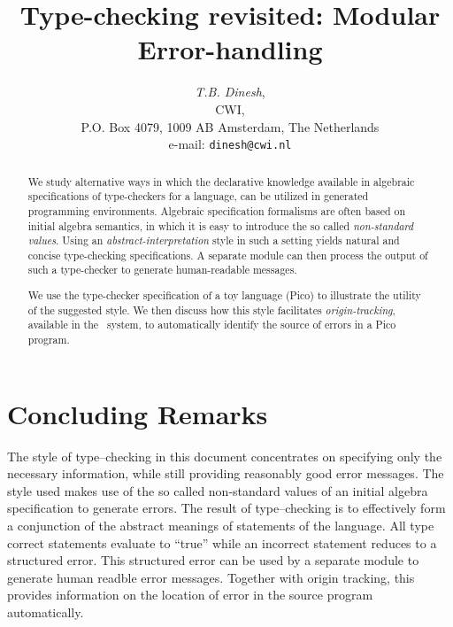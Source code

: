 




\setlength{\textwidth}{15cm}
\setlength{\oddsidemargin}{0.46cm}
\setlength{\evensidemargin}{0.46cm}


\title{\bf Type-checking revisited: Modular Error-handling}
\author{{\em T.B. Dinesh}, \\
        CWI, \\
        P.O. Box 4079, 1009 AB Amsterdam, The Netherlands\\
        e-mail: {\tt dinesh@cwi.nl}}
\maketitle
%
%


\begin{abstract}

We study alternative ways in which the declarative
knowledge available in algebraic specifications of type-checkers
for a language, can be utilized in generated programming environments.
Algebraic specification formalisms are often based
on initial algebra semantics, in which it is easy to
introduce the so called {\em non-standard values}.
Using an {\em abstract-interpretation} style in such a
setting yields natural and concise type-checking specifications.
A separate module can then process the output
of such a type-checker to generate human-readable messages.

We use the type-checker specification of a toy language (Pico)
to illustrate the utility of the suggested style. 
We then discuss how this style facilitates {\em origin-tracking},
available in the \asdf\ system, to 
automatically identify the source of errors in a Pico program.

\end{abstract}


%	

\section{Concluding Remarks}

The style of type--checking in this document concentrates on specifying
only the necessary information, while still providing reasonably good
error messages. 
The style used makes use of the so called non-standard values of an
initial algebra specification to generate errors.
The result of type--checking is to effectively
form a conjunction of the abstract meanings of statements of the
language. All type correct statements evaluate to ``true'' while
an incorrect statement reduces to a structured error. 
This structured error can be used by a separate module
to generate human readble error messages.
Together with origin tracking, this provides 
information on the location of error in the source program automatically. 

